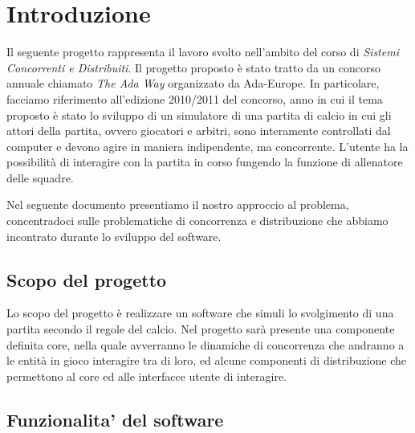 
\section*{Introduzione}
%
\label{sec:introduzione}

Il seguente progetto rappresenta il lavoro svolto nell'ambito del corso di \emph{Sistemi Concorrenti e Distribuiti}. Il progetto proposto \`{e} stato tratto da un concorso annuale chiamato \emph{The Ada Way} organizzato da Ada-Europe. In particolare, facciamo riferimento all'edizione 2010/2011 del concorso, anno in cui il tema proposto \`{e} stato lo sviluppo di un simulatore di una partita di calcio in cui gli attori della partita, ovvero giocatori e arbitri, sono interamente controllati dal computer e devono agire in maniera indipendente, ma concorrente. L'utente ha la possibilit\`{a} di interagire con la partita in corso fungendo la funzione di allenatore delle squadre. 

Nel seguente documento presentiamo il nostro approccio al problema, concentradoci sulle problematiche di concorrenza e distribuzione che abbiamo incontrato durante lo sviluppo del software.

\subsection*{Scopo del progetto}
%
\label{sec:scopo_del_progetto}
Lo scopo del progetto \`{e} realizzare un software che simuli lo svolgimento di una partita secondo il regole del calcio. Nel progetto sar\`{a} presente una componente definita core, nella quale avverranno le dinamiche di concorrenza che andranno a le entit\`{a} in gioco interagire tra di loro, ed alcune componenti di distribuzione che permettono al core ed alle interfacce utente di interagire.

\subsection*{Funzionalita' del software}
%
\label{sec:funzionalita_del_software}

